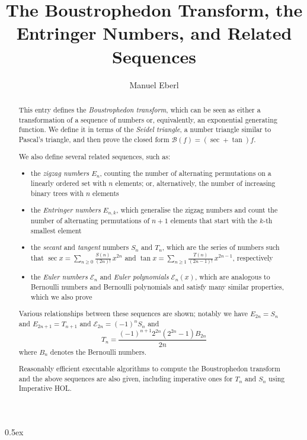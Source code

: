 \documentclass[11pt,a4paper]{article}
\begin{document}
\title{The Boustrophedon Transform, the Entringer Numbers, and Related Sequences}
\author{Manuel Eberl}
\maketitle

\begin{abstract}
This entry defines the \emph{Boustrophedon transform}, which can be seen as either a transformation of a sequence of numbers or, equivalently, an exponential generating function.
We define it in terms of the \emph{Seidel triangle}, a number triangle similar to Pascal's triangle, and then prove the closed form $\mathcal B(f) = (\sec + \tan) f$.

We also define several related sequences, such as:
\begin{itemize}
\item the \emph{zigzag numbers} $E_n$, counting the number of alternating permutations on a linearly ordered set with $n$ elements; or, alternatively, the number of increasing binary trees with $n$ elements
\item the \emph{Entringer numbers} $E_{n,k}$, which generalise the zigzag numbers and count the number of alternating permutations of $n+1$ elements that start with the $k$-th smallest element
\item the \emph{secant} and \emph{tangent} numbers $S_n$ and $T_n$, which are the series of numbers such that $\sec x = \sum_{n\geq 0} \frac{S(n)}{(2n)!}\,x^{2n}$ and $\tan x = \sum_{n\geq 1} \frac{T(n)}{(2n-1)!}\,x^{2n-1}$, respectively
\item the \emph{Euler numbers} $\mathcal{E}_n$ and \emph{Euler polynomials} $\mathcal{E}_n(x)$, which are analogous to Bernoulli numbers and Bernoulli polynomials and satisfy many similar properties, which we also prove
\end{itemize}

Various relationships between these sequences are shown; notably we have $E_{2n} = S_n$ and $E_{2n+1} = T_{n+1}$ and $\mathcal E_{2n} = (-1)^n S_n$ and
\[T_n = \frac{(-1)^{n+1} 2^{2n} (2^{2n}-1) B_{2n}}{2n}\]
where $B_n$ denotes the Bernoulli numbers.

Reasonably efficient executable algorithms to compute the Boustrophedon transform and the above sequences are also given, including imperative ones for $T_n$ and $S_n$ using Imperative HOL.
\end{abstract}

\newpage
\tableofcontents

\newpage
\parindent 0pt\parskip 0.5ex



\nocite{zimmermann99}
\nocite{bertot02}
\raggedright


\end{document}
